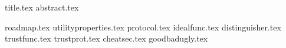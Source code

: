 \documentclass[11pt]{llncs}
\begin{document}
{title.tex}
\thispagestyle{plain}
{abstract.tex}

{roadmap.tex}
{utilityproperties.tex}
{protocol.tex}
{idealfunc.tex}
{distinguisher.tex}
{trustfunc.tex}
{trustprot.tex}
{cheatsec.tex}
{goodbadugly.tex}

\end{document}
